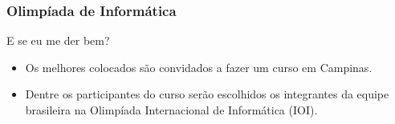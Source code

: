 \begin{frame}
 \frametitle{Olimpíada de Informática}
 \begin{block}{E se eu me der bem?}
  \begin{itemize}
   \item Os melhores colocados são convidados a fazer um curso em Campinas.
   \item Dentre os participantes do curso serão escolhidos os integrantes da equipe
brasileira na Olimpíada Internacional de Informática (IOI).
  \end{itemize}
 \end{block}
\end{frame}
